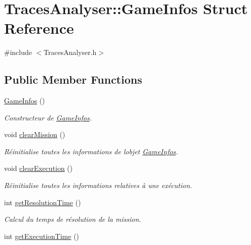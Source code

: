 \hypertarget{struct_traces_analyser_1_1_game_infos}{}\section{Traces\+Analyser\+:\+:Game\+Infos Struct Reference}
\label{struct_traces_analyser_1_1_game_infos}


{\ttfamily \#include $<$Traces\+Analyser.\+h$>$}

\subsection*{Public Member Functions}
\begin{DoxyCompactItemize}
\item 
\hyperlink{struct_traces_analyser_1_1_game_infos_a6c95d2699b29e297aaaaed93fca6446a}{Game\+Infos} ()
\begin{DoxyCompactList}\small\item\em Constructeur de \hyperlink{struct_traces_analyser_1_1_game_infos}{Game\+Infos}. \end{DoxyCompactList}\item 
void \hyperlink{struct_traces_analyser_1_1_game_infos_a313f36b89634c6cdcd68274f3fa7318d}{clear\+Mission} ()
\begin{DoxyCompactList}\small\item\em Réinitialise toutes les informations de l\textquotesingle{}objet \hyperlink{struct_traces_analyser_1_1_game_infos}{Game\+Infos}. \end{DoxyCompactList}\item 
void \hyperlink{struct_traces_analyser_1_1_game_infos_aee048954110f387b71d66ef5528c09d5}{clear\+Execution} ()
\begin{DoxyCompactList}\small\item\em Réinitialise toutes les informations relatives à une exécution. \end{DoxyCompactList}\item 
int \hyperlink{struct_traces_analyser_1_1_game_infos_a67c16e181087d3fceab87a4ac786a24a}{get\+Resolution\+Time} ()
\begin{DoxyCompactList}\small\item\em Calcul du temps de résolution de la mission. \end{DoxyCompactList}\item 
int \hyperlink{struct_traces_analyser_1_1_game_infos_a7736e87dac7d9caa86b8b27560f2e95f}{get\+Execution\+Time} ()

\end{DoxyCompactItemize}
